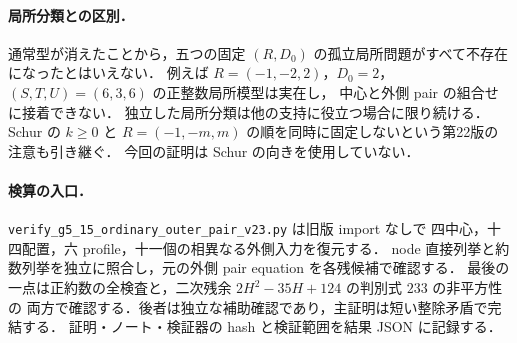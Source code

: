 \paragraph{局所分類との区別．}
通常型が消えたことから，五つの固定 $(R,D_0)$ の孤立局所問題がすべて不存在になったとはいえない．
例えば $R=(-1,-2,2)$，$D_0=2$，$(S,T,U)=(6,3,6)$ の正整数局所模型は実在し，
中心と外側 pair の組合せに接着できない．
独立した局所分類は他の支持に役立つ場合に限り続ける．
Schur の $k\ge0$ と $R=(-1,-m,m)$ の順を同時に固定しないという第22版の注意も引き継ぐ．
今回の証明は Schur の向きを使用していない．

\paragraph{検算の入口．}
\nolinkurl{verify_g5_15_ordinary_outer_pair_v23.py} は旧版 import なしで
四中心，十四配置，六 profile，十一個の相異なる外側入力を復元する．
node 直接列挙と約数列挙を独立に照合し，元の外側 pair equation を各残候補で確認する．
最後の一点は正約数の全検査と，二次残余 $2H^2-35H+124$ の判別式 $233$ の非平方性の
両方で確認する．後者は独立な補助確認であり，主証明は短い整除矛盾で完結する．
証明・ノート・検証器の hash と検証範囲を結果 JSON に記録する．
